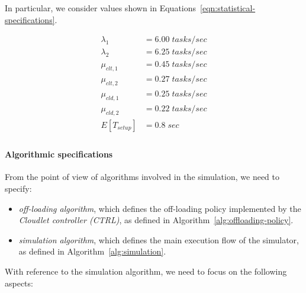 In particular, we consider values shown in Equations~\ref{eqn:statistical-specifications}.

\begin{equation} 
\begin{split}
\lambda_{1}  &=6.00\;tasks/sec \\
\lambda_{2}  &=6.25\;tasks/sec \\
\mu_{clt,1}  &=0.45\;tasks/sec \\
\mu_{clt,2}  &=0.27\;tasks/sec \\
\mu_{cld,1}  &=0.25\;tasks/sec \\
\mu_{cld,2}  &=0.22\;tasks/sec \\
E[T_{setup}] &=0.8\;sec \\
\end{split}
\label{eqn:statistical-specifications}
\end{equation}

\paragraph{Algorithmic specifications}
From the point of view of algorithms involved in the simulation, we need to specify:

\begin{itemize}
	
	\item \textit{off-loading algorithm}, which defines the off-loading policy implemented by the \textit{Cloudlet controller (CTRL)}, as defined in Algorithm~\ref{alg:offloading-policy}.
	
	\item \textit{simulation algorithm}, which defines the main execution flow of the simulator, as defined in Algorithm~\ref{alg:simulation}.
\end{itemize}

With reference to the simulation algorithm, we need to focus on the following aspects:

